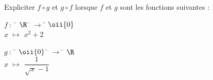 \begin{exercice}[*]
    Expliciter  $f\circ g$ et $g\circ f$ lorsque $f$ et $g$
    sont les fonctions suivantes :
    \begin{multicols}{2}
        \begin{tabbing}
            $f\ :\ $	\=	$\R$	\=	$\longrightarrow$	\=	$\oii{0}$\\
            \>	$x$		\> 	$\longmapsto$		\>	$x^2+2$
        \end{tabbing}
        \begin{tabbing}
            $g\ :\ $	\=	$\oii{0}$	\=	$\longrightarrow$	\=	$\R$\\
            \>	$x$		\> 	$\longmapsto$		\>	$\dfrac{1}{\sqrt{x}-1}$
        \end{tabbing}
    \end{multicols}
\end{exercice}

